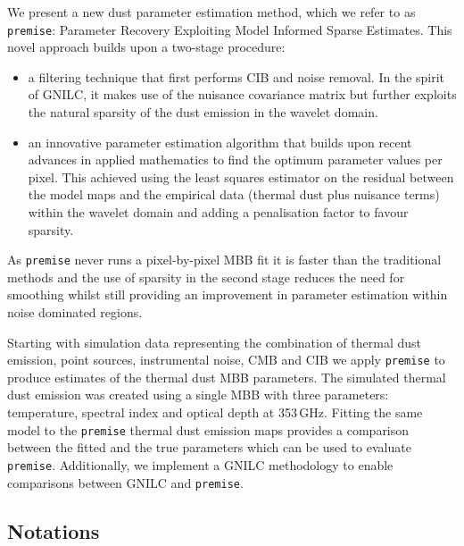 \documentclass[a4paper,fleqn,usenatbib]{mnras}
\begin{document}
We present a new dust parameter estimation method, which we refer to as {\texttt{premise}}: Parameter Recovery Exploiting Model Informed Sparse Estimates. This novel approach builds upon a two-stage procedure:
\begin{itemize}
\item a filtering technique that first performs CIB and noise removal. In the spirit of GNILC, it makes use of the nuisance covariance matrix but further exploits the natural sparsity of the dust emission in the wavelet domain.\\

\item an innovative parameter estimation algorithm that builds upon recent advances in applied mathematics to find the optimum parameter values per pixel. This achieved using the least squares estimator on the residual between the model maps and the empirical data (thermal dust plus nuisance terms) within the wavelet domain and adding a penalisation factor to favour sparsity.
\end{itemize} 
As {\texttt{premise}} never runs a pixel-by-pixel MBB fit it is faster than the traditional methods and the use of sparsity in the second stage reduces the need for smoothing whilst still providing an improvement in parameter estimation within noise dominated regions. 

Starting with simulation data representing the combination of thermal dust emission, point sources, instrumental noise, CMB and CIB we apply {\texttt{premise}} to produce estimates of the thermal dust MBB parameters. The simulated thermal dust emission was created using a single MBB with three parameters: temperature, spectral index and optical depth at 353\,GHz. Fitting the same model to the {\texttt{premise}} thermal dust emission maps provides a comparison between the fitted and the true parameters which can be used to evaluate {\texttt{premise}}. Additionally, we implement a GNILC methodology \citep{gnilc} to enable comparisons between GNILC and {\texttt{premise}}.

\subsection{Notations}
\end{document}
